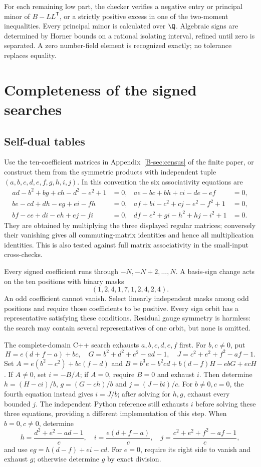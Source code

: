 \documentclass[11pt]{article}
\begin{document}
For each remaining low part, the checker verifies a negative entry or
principal minor of $B-LL^{\mathsf T}$, or a strictly positive excess in
one of the two-moment inequalities. Every principal minor is calculated
over $\Q$. Algebraic signs are determined by Horner bounds on a rational
isolating interval, refined until zero is separated. A zero number-field
element is recognized exactly; no tolerance replaces equality.

\section{Completeness of the signed searches}
\subsection{Self-dual tables}
Use the ten-coefficient matrices in Appendix~\ref{B-sec:census} of the
finite paper, or
construct them from the symmetric products with independent tuple
$(a,b,c,d,e,f,g,h,i,j)$. In this convention the six associativity equations
are
\begin{align*}
 ad-b^2+bg+ch-d^2-e^2+1&=0,&ae-bc+bh+ci-de-ef&=0,\\
 be-cd+dh-eg+ei-fh&=0,&af+bi-c^2+cj-e^2-f^2+1&=0,\\
 bf-ce+di-eh+ej-fi&=0,&df-e^2+gi-h^2+hj-i^2+1&=0.
\end{align*}
They are obtained by multiplying the three displayed regular matrices;
conversely their vanishing gives all commuting-matrix identities and hence
all multiplication identities. This is also tested against full matrix
associativity in the small-input cross-checks.

Every signed coefficient runs through $-N,-N+2,\ldots,N$. A basis-sign
change acts on the ten positions with binary masks
\[
 (1,2,4,1,7,1,2,4,2,4).
\]
An odd coefficient cannot vanish. Select linearly independent masks among
odd positions and require those coefficients to be positive. Every sign
orbit has a representative satisfying these conditions. Residual gauge
symmetry is harmless: the search may contain several representatives of
one orbit, but none is omitted.

The complete-domain C++ search exhausts $a,b,c,d,e,f$ first.
For $b,c\ne0$, put
\[
 H=e(d+f-a)+bc,\quad G=b^2+d^2+e^2-ad-1,
 \quad J=c^2+e^2+f^2-af-1.
\]
Set $A=e(b^2-c^2)+bc(f-d)$ and
$B=b^3e-b^2cd+b(d-f)H-ebG+ecH$.
If $A\ne0$, set $i=-B/A$; if $A=0$, require $B=0$ and exhaust $i$.
Then determine $h=(H-ci)/b$, $g=(G-ch)/b$ and $j=(J-bi)/c$.
For $b\ne0,c=0$, the fourth equation instead gives $i=J/b$;
after solving for $h,g$, exhaust every bounded $j$.
The independent Python reference still exhausts $i$ before solving
these three equations, providing a different implementation of this step.
When $b=0,c\ne0$, determine
\[
 h=\frac{d^2+e^2-ad-1}{c},\quad
 i=\frac{e(d+f-a)}c,\quad
 j=\frac{c^2+e^2+f^2-af-1}c,
\]
and use $eg=h(d-f)+ei-cd$. For $e=0$, require its right side to vanish
and exhaust $g$; otherwise determine $g$ by exact division.
\end{document}
